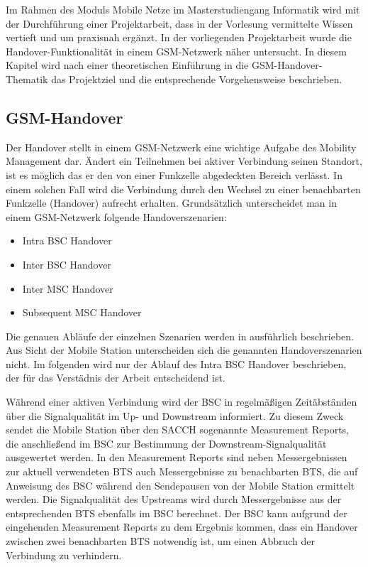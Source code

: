 
Im Rahmen des Moduls Mobile Netze im Masterstudiengang Informatik wird mit der Durchführung einer Projektarbeit, dass in der Vorlesung vermittelte Wissen vertieft und um praxisnah ergänzt. In der vorliegenden Projektarbeit wurde die Handover-Funktionalität in einem GSM-Netzwerk näher untersucht. In diesem Kapitel wird nach einer theoretischen Einführung in die GSM-Handover-Thematik das Projektziel und die entsprechende Vorgehensweise beschrieben.

\subsection{GSM-Handover}\label{sec:handover}

Der Handover stellt in einem GSM-Netzwerk eine wichtige Aufgabe des Mobility Management dar. Ändert ein Teilnehmen bei aktiver Verbindung seinen Standort, ist es möglich das er den von einer Funkzelle abgedeckten Bereich verlässt. In einem solchen Fall wird die Verbindung durch den Wechsel zu einer benachbarten Funkzelle (Handover) aufrecht erhalten. Grundsätzlich unterscheidet man in einem GSM-Netzwerk folgende Handoverszenarien:

\begin{itemize}
 \item Intra BSC Handover
 \item Inter BSC Handover
 \item Inter MSC Handover
 \item Subsequent MSC Handover
\end{itemize}

Die genauen Abläufe der einzelnen Szenarien werden in \cite{bib:grundkursmks} ausführlich beschrieben. Aus Sicht der Mobile Station unterscheiden sich die genannten Handoverszenarien nicht. Im folgenden wird nur der Ablauf des Intra BSC Handover beschrieben, der für das Verstädnis der Arbeit entscheidend ist.

Während einer aktiven Verbindung wird der BSC in regelmäßigen Zeitäbständen über die Signalqualität im Up- und Downstream informiert. Zu diesem Zweck sendet die Mobile Station über den SACCH sogenannte Measurement Reports, die anschließend im BSC zur Bestimmung der Downstream-Signalqualität ausgewertet werden. In den Measurement Reports sind neben Messergebnissen zur aktuell verwendeten BTS auch Messergebnisse zu benachbarten BTS, die auf Anweisung des BSC während den Sendepausen von der Mobile Station ermittelt werden. Die Signalqualität des Upstreams wird durch Messergebnisse aus der entsprechenden BTS ebenfalls im BSC berechnet. Der BSC kann aufgrund der eingehenden Measurement Reports zu dem Ergebnis kommen, dass ein Handover zwischen zwei benachbarten BTS notwendig ist, um einen Abbruch der Verbindung zu verhindern.

